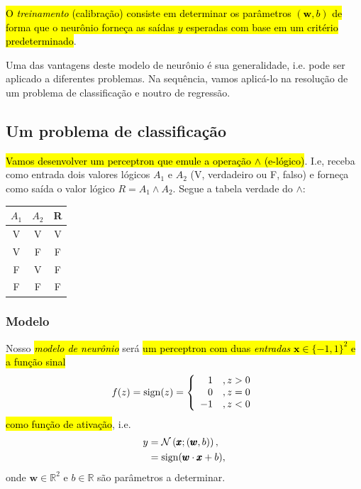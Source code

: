 \hl{O \emph{treinamento} (calibração) consiste em determinar os parâmetros $(\pmb{w}, b)$ de forma que o neurônio forneça as saídas $y$ esperadas com base em um critério predeterminado}.

Uma das vantagens deste modelo de neurônio é sua generalidade, i.e. pode ser aplicado a diferentes problemas. Na sequência, vamos aplicá-lo na resolução de um problema de classificação e noutro de regressão.


\subsection{Um problema de classificação}\label{cap_perceptron_ssec_classic}

\hl{Vamos desenvolver um perceptron que emule a operação $\land$ (e-lógico)}. I.e, receba como entrada dois valores lógicos $A_1$ e $A_2$ (V, verdadeiro ou F, falso) e forneça como saída o valor lógico $R = A_1 \land A_2$. Segue a tabela verdade do $\land$:

\begin{center}
  \begin{tabular}{cc|c}
    $A_1$ & $A_2$ & R\\\hline
    V & V & V\\
    V & F & F\\
    F & V & F\\
    F & F & F\\\hline
  \end{tabular}
\end{center}


\subsubsection{Modelo}

Nosso \hl{\emph{modelo de neurônio}} será \hl{um perceptron com duas \emph{entradas} $\pmb{x}\in \{-1,1\}^2$ e a função sinal}
\begin{equation}
  f(z) = \operatorname{sign}(z) = \left\{
    \begin{array}{rr}
      1 &, z>0\\
      0 &, z=0\\
      -1 &, z<0
    \end{array}
\right.
\end{equation}
\hl{como função de ativação}, i.e.
\begin{align}
  y &= \mathcal{N}\left(\pmb{x}; (\pmb{w}, b)\right),\\
    &= \operatorname{sign}(\pmb{w}\cdot\pmb{x} + b),
\end{align}
onde $\pmb{w}\in\mathbb{R}^2$ e $b\in\mathbb{R}$ são parâmetros a determinar.


